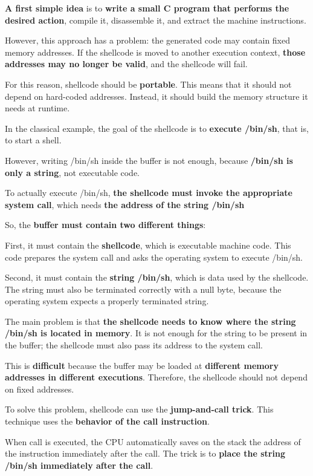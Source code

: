\documentclass{article}
\begin{document}
\textbf{A first simple idea} is to \textbf{write a small C program that performs the desired action}, compile it, disassemble it, and extract the machine instructions.

However, this approach has a problem: the generated code may contain fixed memory addresses. If the shellcode is moved to another execution context, \textbf{those addresses may no longer be valid}, and the shellcode will fail.

For this reason, shellcode should be \textbf{portable}. This means that it should not depend on hard-coded addresses. Instead, it should build the memory structure it needs at runtime.

In the classical example, the goal of the shellcode is to \textbf{execute /bin/sh}, that is, to start a shell.

However, writing /bin/sh inside the buffer is not enough, because \textbf{/bin/sh is only a string}, not executable code.

To actually execute /bin/sh, \textbf{the shellcode must invoke the appropriate system call}, which needs \textbf{the address of the string /bin/sh}

So, the \textbf{buffer must contain two different things}:

First, it must contain the \textbf{shellcode}, which is executable machine code. This code prepares the system call and asks the operating system to execute /bin/sh.

Second, it must contain the \textbf{string /bin/sh}, which is data used by the shellcode. The string must also be terminated correctly with a null byte, because the operating system expects a properly terminated string.

The main problem is that \textbf{the shellcode needs to know where the string /bin/sh is located in memory}. It is not enough for the string to be present in the buffer; the shellcode must also pass its address to the system call.

This is \textbf{difficult} because the buffer may be loaded at \textbf{different memory addresses in different executions}. Therefore, the shellcode should not depend on fixed addresses.

To solve this problem, shellcode can use the \textbf{jump-and-call trick}. This technique uses the \textbf{behavior of the call instruction}.

When call is executed, the CPU automatically saves on the stack the address of the instruction immediately after the call. The trick is to \textbf{place the string /bin/sh immediately after the call}.
\end{document}
